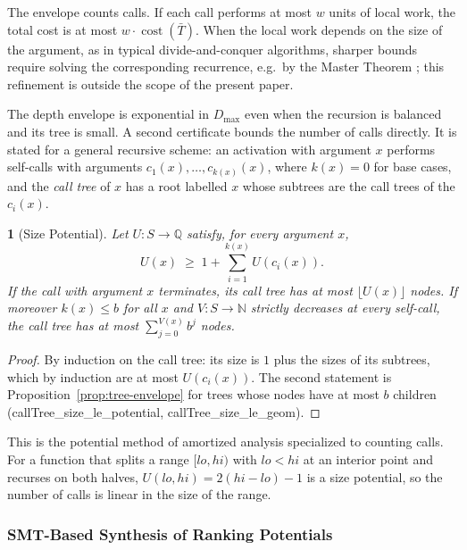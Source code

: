 \documentclass[oneside,english]{amsart}
\numberwithin{equation}{section}
\numberwithin{figure}{section}
\theoremstyle{plain}
\theoremstyle{definition}
\theoremstyle{plain}
\newtheorem{prop}[thm]{\protect\propositionname}
\theoremstyle{remark}
\theoremstyle{plain}
\theoremstyle{definition}
\theoremstyle{plain}
\theoremstyle{remark}
\DeclareMathOperator{\cost}{cost}
\newcommand{\lean}[1]{{\ttfamily\small #1}}
\providecommand{\propositionname}{Proposition}
\begin{document}
The envelope counts calls. If each call performs at most $w$ units of local work, the total cost is at most $w \cdot \cost(\bar{T})$. When the local work depends on the size of the argument, as in typical divide-and-conquer algorithms, sharper bounds require solving the corresponding recurrence, e.g.\ by the Master Theorem \cite{cormen2009introduction}; this refinement is outside the scope of the present paper.

The depth envelope is exponential in $D_{\max}$ even when the recursion is balanced and its tree is small. A second certificate bounds the number of calls directly. It is stated for a general recursive scheme: an activation with argument $x$ performs self-calls with arguments $c_1(x), \dots, c_{k(x)}(x)$, where $k(x) = 0$ for base cases, and the \textit{call tree} of $x$ has a root labelled $x$ whose subtrees are the call trees of the $c_i(x)$.

\begin{prop}[Size Potential]\label{prop:size-potential}
Let $U : S \to \mathbb{Q}$ satisfy, for every argument $x$,
\[
U(x) \;\ge\; 1 + \sum_{i=1}^{k(x)} U\left(c_i(x)\right).
\]
If the call with argument $x$ terminates, its call tree has at most $\lfloor U(x) \rfloor$ nodes. If moreover $k(x) \le b$ for all $x$ and $V : S \to \mathbb{N}$ strictly decreases at every self-call, the call tree has at most $\sum_{j=0}^{V(x)} b^j$ nodes.
\end{prop}

\begin{proof}
By induction on the call tree: its size is $1$ plus the sizes of its subtrees, which by induction are at most $U(c_i(x))$. The second statement is Proposition~\ref{prop:tree-envelope} for trees whose nodes have at most $b$ children (\lean{callTree\_\allowbreak size\_\allowbreak le\_\allowbreak potential}, \lean{callTree\_\allowbreak size\_\allowbreak le\_\allowbreak geom}).
\end{proof}

This is the potential method of amortized analysis \cite{hoffmann2012multivariate} specialized to counting calls. For a function that splits a range $[lo, hi)$ with $lo < hi$ at an interior point and recurses on both halves, $U(lo, hi) = 2(hi - lo) - 1$ is a size potential, so the number of calls is linear in the size of the range.

\subsubsection{SMT-Based Synthesis of Ranking Potentials}
\label{subsubsec:smt-synthesis}
\end{document}
